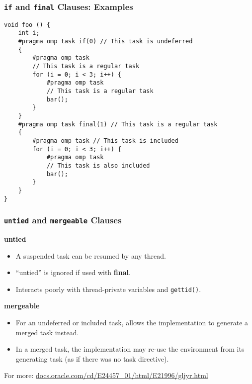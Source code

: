 \documentclass[aspectratio=43]{beamer}
\newenvironment{changemargin}[1]{%
  \begin{list}{}{%
    \setlength{\topsep}{0pt}%
    \setlength{\leftmargin}{#1}%
    \setlength{\rightmargin}{1em}
    \setlength{\listparindent}{\parindent}%
    \setlength{\itemindent}{\parindent}%
    \setlength{\parsep}{\parskip}%
  }%
  \item[]}{\end{list}}
\begin{document}
\begin{frame}[fragile]
  \frametitle{{\tt if} and {\tt final} Clauses: Examples}

  \begin{lstlisting}
void foo () {
    int i;
    #pragma omp task if(0) // This task is undeferred
    {
        #pragma omp task
        // This task is a regular task
        for (i = 0; i < 3; i++) {
            #pragma omp task
            // This task is a regular task
            bar();
        }
    }
    #pragma omp task final(1) // This task is a regular task
    {
        #pragma omp task // This task is included
        for (i = 0; i < 3; i++) {
            #pragma omp task
            // This task is also included
            bar();
        }
    }
}
  \end{lstlisting}
\end{frame}

\begin{frame}
  \frametitle{{\tt untied} and {\tt mergeable} Clauses}

  \begin{changemargin}{1.5cm}
\begin{center}
  {\bf untied}
\end{center}
  \begin{itemize}
    \item A suspended task can be resumed by any thread.
    \item ``untied'' is ignored if used with {\bf final}.
    \item Interacts poorly with thread-private variables and {\tt gettid()}.
  \end{itemize}

\begin{center}
  {\bf mergeable}
\end{center}

  \begin{itemize}
    \item For an undeferred or included task,
    allows the implementation to generate a merged task instead.
    \item In a merged task, the implementation may re-use the environment from its generating task (as if there was no task directive).
  \end{itemize}

  For more: \url{docs.oracle.com/cd/E24457_01/html/E21996/gljyr.html}
  \end{changemargin}
\end{frame}
\end{document}
